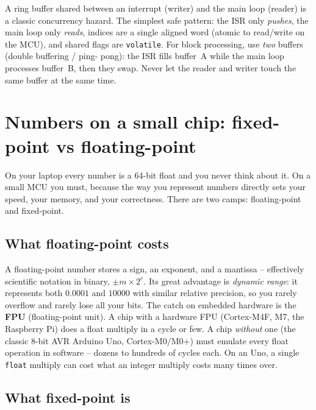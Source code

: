 \begin{trapbox}
A ring buffer shared between an interrupt (writer) and the main loop (reader) is a classic
concurrency hazard. The simplest safe pattern: the ISR only \emph{pushes}, the main loop only
\emph{reads}, indices are a single aligned word (atomic to read/write on the MCU), and shared
flags are \texttt{volatile}. For block processing, use \emph{two} buffers (double buffering / ping-
pong): the ISR fills buffer~A while the main loop processes buffer~B, then they swap. Never let the
reader and writer touch the same buffer at the same time.
\end{trapbox}

\section{Numbers on a small chip: fixed-point vs floating-point}
\label{ch40:fixed-point}

On your laptop every number is a 64-bit float and you never think about it. On a small MCU you
must, because the way you represent numbers directly sets your speed, your memory, and your
correctness. There are two camps: floating-point and fixed-point.

\subsection{What floating-point costs}

A floating-point number stores a sign, an exponent, and a mantissa -- effectively scientific
notation in binary, $\pm m \times 2^{e}$. Its great advantage is \emph{dynamic range}: it represents both
$0.0001$ and $10000$ with similar relative precision, so you rarely overflow and rarely lose all
your bits. The catch on embedded hardware is the \textbf{FPU} (floating-point unit). A chip with a
hardware FPU (Cortex-M4F, M7, the Raspberry Pi) does a float multiply in a cycle or few. A chip
\emph{without} one (the classic 8-bit AVR Arduino Uno, Cortex-M0/M0+) must emulate every float
operation in software -- dozens to hundreds of cycles each. On an Uno, a single \texttt{float}
multiply can cost what an integer multiply costs many times over.

\subsection{What fixed-point is}

